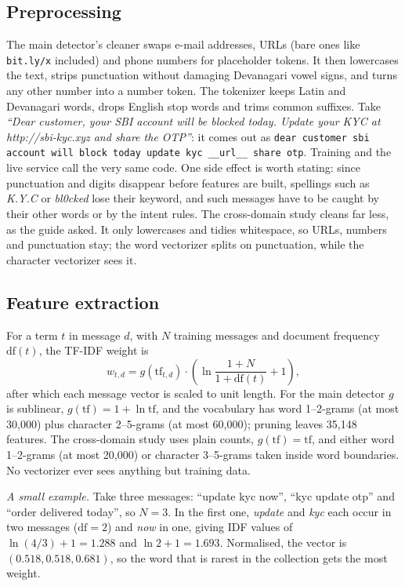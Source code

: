 \subsection{Preprocessing}
The main detector's cleaner swaps e-mail addresses, URLs (bare ones like \texttt{bit.ly/x} included) and phone numbers for placeholder tokens. It then lowercases the text, strips punctuation without damaging Devanagari vowel signs, and turns any other number into a number token. The tokenizer keeps Latin and Devanagari words, drops English stop words and trims common suffixes. Take \textit{``Dear customer, your SBI account will be blocked today. Update your KYC at http://sbi-kyc.xyz and share the OTP''}: it comes out as \texttt{dear customer sbi account will block today update kyc \_\_url\_\_ share otp}. Training and the live service call the very same code. One side effect is worth stating: since punctuation and digits disappear before features are built, spellings such as \textit{K.Y.C} or \textit{bl0cked} lose their keyword, and such messages have to be caught by their other words or by the intent rules. The cross-domain study cleans far less, as the guide asked. It only lowercases and tidies whitespace, so URLs, numbers and punctuation stay; the word vectorizer splits on punctuation, while the character vectorizer sees it.

\subsection{Feature extraction}
For a term $t$ in message $d$, with $N$ training messages and document frequency $\mathrm{df}(t)$, the TF-IDF weight is
\begin{equation}
w_{t,d}=g(\mathrm{tf}_{t,d})\cdot\left(\ln\frac{1+N}{1+\mathrm{df}(t)}+1\right),
\end{equation}
after which each message vector is scaled to unit length. For the main detector $g$ is sublinear, $g(\mathrm{tf})=1+\ln\mathrm{tf}$, and the vocabulary has word 1--2-grams (at most 30,000) plus character 2--5-grams (at most 60,000); pruning leaves 35,148 features. The cross-domain study uses plain counts, $g(\mathrm{tf})=\mathrm{tf}$, and either word 1--2-grams (at most 20,000) or character 3--5-grams taken inside word boundaries. No vectorizer ever sees anything but training data.

\textit{A small example.} Take three messages: ``update kyc now'', ``kyc update otp'' and ``order delivered today'', so $N=3$. In the first one, \textit{update} and \textit{kyc} each occur in two messages ($\mathrm{df}=2$) and \textit{now} in one, giving IDF values of $\ln(4/3)+1=1.288$ and $\ln 2+1=1.693$. Normalised, the vector is $(0.518, 0.518, 0.681)$, so the word that is rarest in the collection gets the most weight.

